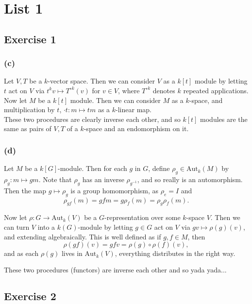 \documentclass{article}
\theoremstyle{definition}
\newcommand{\Aut}{\text{Aut}}
\begin{document}
\section*{List 1}

\subsection*{Exercise 1}

\subsubsection*{(c)}

Let $V, T$ be a $k$-vector space. Then we can consider $V$ as a $k[t]$ module
by letting $t$ act on $V$ via $t^k v \mapsto T^{\circ k}(v)$ for $v \in V$,
where $T^{\circ k}$ denotes $k$ repeated applications. \\

Now let $M$ be a $k[t]$ module. Then we can consider $M$ as a $k$-space, and
multiplication by $t$, $\cdot t : m \mapsto tm$ as a $k$-linear map. \\

These two procedures are clearly inverse each other, and so $k[t]$ modules are
the same as pairs of $V, T$ of a $k$-space and an endomorphism on it.

\subsubsection*{(d)}

Let $M$ be a $k[G]$-module. Then for each $g$ in $G$, define $\rho_g \in
\Aut_{k}(M)$ by $\rho_{g} : m \mapsto gm$. Note that $\rho_g$ has an inverse
$\rho_{g^{-1}}$, and so really is an automorphism. Then the map $g \mapsto
\rho_g$ is a group homomorphism, as $\rho_e = I$ and
\[
	\rho_{gf}(m)
	=
	gfm
	=
	g\rho_{f}(m)
	=
	\rho_{g}\rho_f(m).
\]

Now let $\rho : G \to \Aut_k(V)$ be a $G$-representation over some $k$-space
$V$. Then we can turn $V$ into a $k(G)$-module by letting $g \in G$ act on $V$
via $gv \mapsto \rho(g)(v)$, and extending algebraically. This is well defined
as if $g, f \in M$, then
\[
	\rho(gf)(v)
	=
	gfv
	=
	\rho(g) \circ \rho(f)(v),
\]
and as each $\rho(g)$ lives in $\Aut_k(V)$, everything distributes in the right
way.

These two procedures (functors) are inverse each other and so yada yada... \\


\subsection*{Exercise 2}
\end{document}
